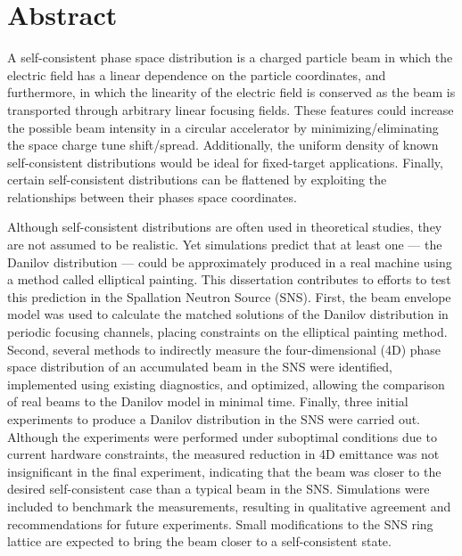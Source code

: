 \chapter*{Abstract} 

A self-consistent phase space distribution is a charged particle beam in which the electric field has a linear dependence on the particle coordinates, and furthermore, in which the linearity of the electric field is conserved as the beam is transported through arbitrary linear focusing fields. These features could increase the possible beam intensity in a circular accelerator by minimizing/eliminating the space charge tune shift/spread. Additionally, the uniform density of known self-consistent distributions would be ideal for fixed-target applications. Finally, certain self-consistent distributions can be flattened by exploiting the relationships between their phases space coordinates.

Although self-consistent distributions are often used in theoretical studies, they are not assumed to be realistic. Yet simulations predict that at least one — the Danilov distribution — could be approximately produced in a real machine using a method called elliptical painting. This dissertation contributes to efforts to test this prediction in the Spallation Neutron Source (SNS). First, the beam envelope model was used to calculate the matched solutions of the Danilov distribution in periodic focusing channels, placing constraints on the elliptical painting method. Second, several methods to indirectly measure the four-dimensional (4D) phase space distribution of an accumulated beam in the SNS were identified, implemented using existing diagnostics, and optimized, allowing the comparison of real beams to the Danilov model in minimal time. Finally, three initial experiments to produce a Danilov distribution in the SNS were carried out. Although the experiments were performed under suboptimal conditions due to current hardware constraints, the measured reduction in 4D emittance was not insignificant in the final experiment, indicating that the beam was closer to the desired self-consistent case than a typical beam in the SNS. Simulations were included to benchmark the measurements, resulting in qualitative agreement and recommendations for future experiments. Small modifications to the SNS ring lattice are expected to bring the beam closer to a self-consistent state.
